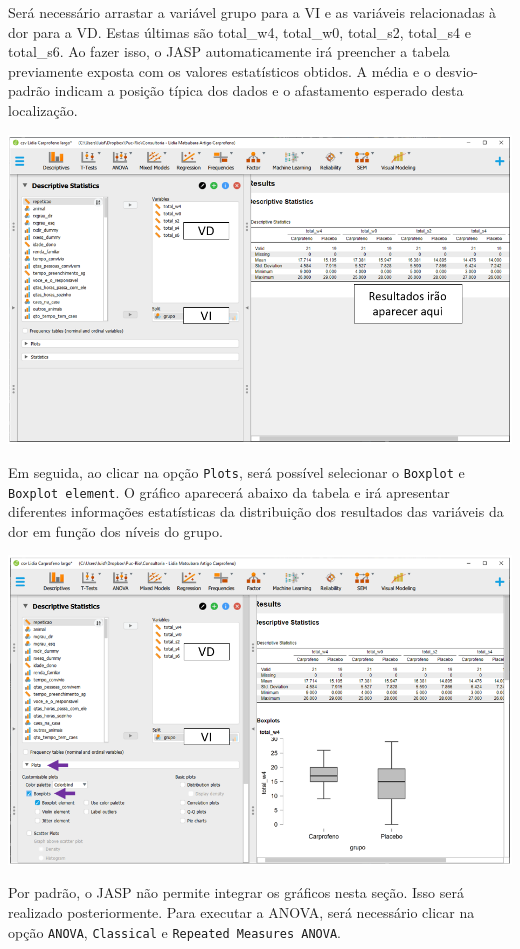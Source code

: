 \documentclass[
]{book}
\begin{document}
Será necessário arrastar a variável grupo para a VI e as variáveis
relacionadas à dor para a VD. Estas últimas são total\_w4, total\_w0,
total\_s2, total\_s4 e total\_s6. Ao fazer isso, o JASP automaticamente
irá preencher a tabela previamente exposta com os valores estatísticos
obtidos. A média e o desvio-padrão indicam a posição típica dos dados e
o afastamento esperado desta localização.

\includegraphics{./img/cap_anovarm_descriptives3.png}

Em seguida, ao clicar na opção \texttt{Plots}, será possível selecionar
o \texttt{Boxplot} e \texttt{Boxplot\ element}. O gráfico aparecerá
abaixo da tabela e irá apresentar diferentes informações estatísticas da
distribuição dos resultados das variáveis da dor em função dos níveis do
grupo.

\includegraphics{./img/cap_anovarm_plots1.png}

Por padrão, o JASP não permite integrar os gráficos nesta seção. Isso
será realizado posteriormente. Para executar a ANOVA, será necessário
clicar na opção \texttt{ANOVA}, \texttt{Classical} e
\texttt{Repeated\ Measures\ ANOVA}.
\end{document}
